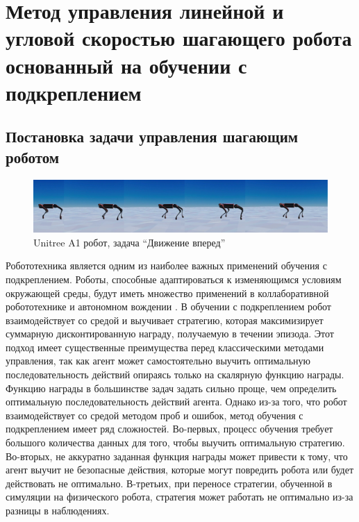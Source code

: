 \chapter{Метод управления линейной и угловой скоростью шагающего робота основанный на обучении с подкреплением}\label{ch:ch3}

\section{Постановка задачи управления шагающим роботом}


\begin{figure}[ht]
    \includegraphics[width=1\textwidth]{images/move_forward.png}
    \caption{Unitree A1 робот, задача ``Движение вперед''}
    \label{fig:mv_forward}
\end{figure}


Робототехника является одним из наиболее важных применений обучения с подкреплением. Роботы, способные адаптироваться к изменяющимся условиям окружающей среды, будут иметь множество применений в коллаборативной робототехнике \cite{levine2016end} и автономном вождении \cite{kiran2021deep}. В обучении с подкреплением робот взаимодействует со средой и выучивает стратегию, которая максимизирует суммарную дисконтированную награду, получаемую в течении эпизода.  Этот подход имеет существенные преимущества перед классическими методами управления, так как агент может самостоятельно выучить оптимальную последовательность действий опираясь только на скалярную функцию награды. Функцию награды в большинстве задач задать сильно проще, чем определить оптимальную последовательность действий агента. Однако из-за того, что робот взаимодействует со средой методом проб и ошибок, метод обучения с подкреплением имеет ряд сложностей. Во-первых, процесс обучения требует большого количества данных для того, чтобы выучить оптимальную стратегию. Во-вторых, не аккуратно заданная функция награды может привести к тому, что агент выучит не безопасные действия, которые могут повредить робота или будет действовать не оптимально. В-третьих, при переносе стратегии, обученной в симуляции на физического робота, стратегия может работать не оптимально из-за разницы в наблюдениях. 

